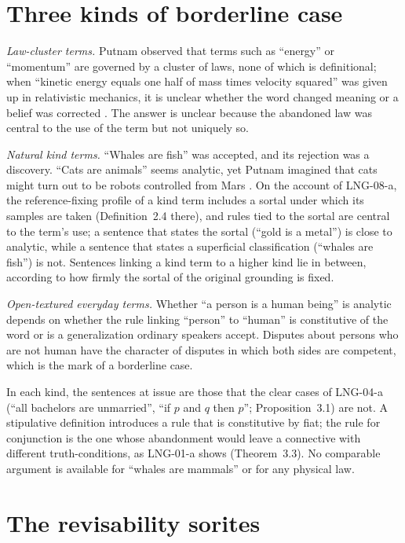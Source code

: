 \documentclass{situationist-preprint}
\begin{document}
\section{Three kinds of borderline case}

\emph{Law-cluster terms.} Putnam observed that terms such as \enquote{energy} or \enquote{momentum} are governed by a cluster of laws, none of which is definitional; when \enquote{kinetic energy equals one half of mass times velocity squared} was given up in relativistic mechanics, it is unclear whether the word changed meaning or a belief was corrected \citep{Putnam1962}. The answer is unclear because the abandoned law was central to the use of the term but not uniquely so.

\emph{Natural kind terms.} \enquote{Whales are fish} was accepted, and its rejection was a discovery. \enquote{Cats are animals} seems analytic, yet Putnam imagined that cats might turn out to be robots controlled from Mars \citep{Putnam1962}. On the account of LNG-08-a, the reference-fixing profile of a kind term includes a sortal under which its samples are taken (Definition~2.4 there), and rules tied to the sortal are central to the term's use; a sentence that states the sortal (\enquote{gold is a metal}) is close to analytic, while a sentence that states a superficial classification (\enquote{whales are fish}) is not. Sentences linking a kind term to a higher kind lie in between, according to how firmly the sortal of the original grounding is fixed.

\emph{Open-textured everyday terms.} Whether \enquote{a person is a human being} is analytic depends on whether the rule linking \enquote{person} to \enquote{human} is constitutive of the word or is a generalization ordinary speakers accept. Disputes about persons who are not human have the character of disputes in which both sides are competent, which is the mark of a borderline case.

In each kind, the sentences at issue are those that the clear cases of LNG-04-a (\enquote{all bachelors are unmarried}, \enquote{if $p$ and $q$ then $p$}; Proposition~3.1) are not. A stipulative definition introduces a rule that is constitutive by fiat; the rule for conjunction is the one whose abandonment would leave a connective with different truth-conditions, as LNG-01-a shows (Theorem~3.3). No comparable argument is available for \enquote{whales are mammals} or for any physical law.

\section{The revisability sorites}
\end{document}
